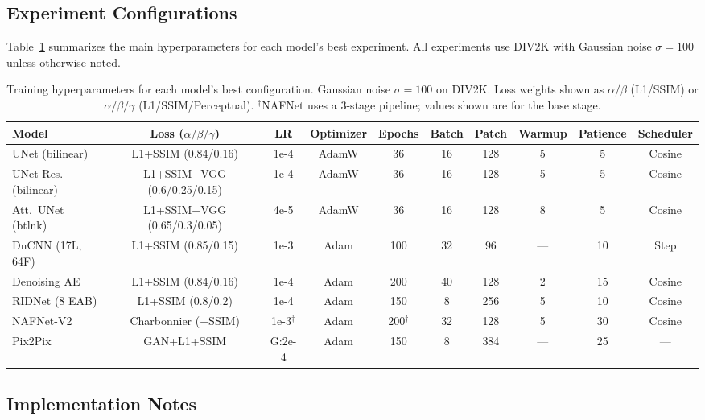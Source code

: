 \subsection{Experiment Configurations}

Table~\ref{tab:hyperparameters} summarizes the main hyperparameters for each model's best experiment. All experiments use DIV2K with Gaussian noise $\sigma = 100$ unless otherwise noted.

\begin{table}[t]
\centering
\small
\setlength{\tabcolsep}{4pt}
\begin{tabular}{lccccccccc}
\toprule
\textbf{Model} & \textbf{Loss ($\alpha/\beta/\gamma$)} & \textbf{LR} & \textbf{Optimizer} & \textbf{Epochs} & \textbf{Batch} & \textbf{Patch} & \textbf{Warmup} & \textbf{Patience} & \textbf{Scheduler} \\
\midrule
UNet (bilinear) & L1+SSIM (0.84/0.16) & 1e-4 & AdamW & 36 & 16 & 128 & 5 & 5 & Cosine \\
UNet Res. (bilinear) & L1+SSIM+VGG (0.6/0.25/0.15) & 1e-4 & AdamW & 36 & 16 & 128 & 5 & 5 & Cosine \\
Att.\ UNet (btlnk) & L1+SSIM+VGG (0.65/0.3/0.05) & 4e-5 & AdamW & 36 & 16 & 128 & 8 & 5 & Cosine \\
DnCNN (17L, 64F) & L1+SSIM (0.85/0.15) & 1e-3 & Adam & 100 & 32 & 96 & --- & 10 & Step \\
Denoising AE & L1+SSIM (0.84/0.16) & 1e-4 & Adam & 200 & 40 & 128 & 2 & 15 & Cosine \\
RIDNet (8 EAB) & L1+SSIM (0.8/0.2) & 1e-4 & Adam & 150 & 8 & 256 & 5 & 10 & Cosine \\
NAFNet-V2 & Charbonnier (+SSIM) & 1e-3$^\dagger$ & Adam & 200$^\dagger$ & 32 & 128 & 5 & 30 & Cosine \\
\midrule
Pix2Pix & GAN+L1+SSIM & G:2e-4 & Adam & 150 & 8 & 384 & --- & 25 & --- \\
\bottomrule
\end{tabular}
\caption{Training hyperparameters for each model's best configuration. Gaussian noise $\sigma = 100$ on DIV2K. Loss weights shown as $\alpha/\beta$ (L1/SSIM) or $\alpha/\beta/\gamma$ (L1/SSIM/Perceptual). $^\dagger$NAFNet uses a 3-stage pipeline; values shown are for the base stage.}
\label{tab:hyperparameters}
\end{table}

\subsection{Implementation Notes}

